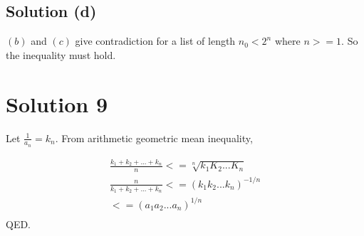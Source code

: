 \documentclass{article}
\begin{document}
\subsection{Solution (d)}
$(b)$ and $(c)$ give contradiction for a list of length $n_0 < 2^n$
where $n >= 1$. So the inequality must hold.

\section{Solution 9}
Let $\frac{1}{a_n} = k_n$. From arithmetic geometric mean inequality,

\begin{align*}
  \frac{k_1 + k_2 + ... + k_n }{n} <= \sqrt[n]{k_1K_2...K_n} \\
  \frac{n}{k_1 + k_2 + ... + k_n } <= (k_1k_2...k_n)^{-1/n} \\
  <= (a_1a_2...a_n)^{1/n} \\
\end{align*}
QED.
\end{document}

